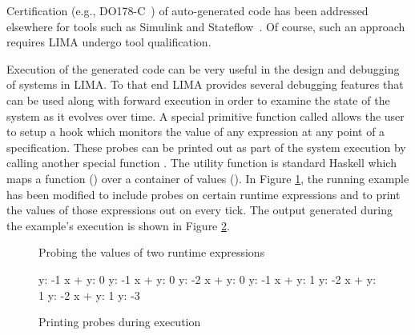 Certification (e.g., DO178-C~\cite{do178c}) of auto-generated code has
been addressed elsewhere for tools such as Simulink and
Stateflow~\cite{mbd-cert}. Of course, such an approach requires LIMA
undergo tool qualification.

Execution of the generated code can be very useful in the design and debugging
of systems in LIMA. To that end LIMA provides several debugging features that
can be used along with forward execution in order to examine the state of the
system as it evolves over time. A special primitive function called 
allows the user to setup a hook which monitors the value of any expression at
any point of a specification. These probes can be printed out as part of the
system execution by calling another special function . The
utility function  is standard Haskell which maps a function
() over a container of values (). In Figure
\ref{fig:code-gen-probes}, the running example has been modified to include
probes on certain runtime expressions and to print the values of those
expressions out on every tick. The output generated during the example's
execution is shown in Figure \ref{fig:code-gen-print-probes}.



\begin{figure}
\caption{Probing the values of two runtime expressions}
\label{fig:code-gen-probes}
\end{figure}

\begin{figure}
\begin{plaintext}
y: -1
x + y: 0
y: -1
x + y: 0
y: -2
x + y: 0
y: -1
x + y: 1
y: -2
x + y: 1
y: -2
x + y: 1
y: -3
\end{plaintext}
\caption{Printing probes during execution}
\label{fig:code-gen-print-probes}
\end{figure}



